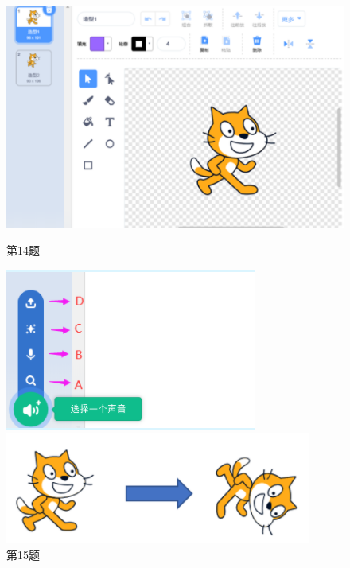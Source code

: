 \documentclass[10.5pt, a4paper]{article}
\begin{document}
\begin{enumerate}
        \begin{figure}[htbp]
            \centering
            \begin{minipage}[t]{.2\textwidth}
                \centering
                \includegraphics[width=\textwidth]{14.png}
                \caption*{第14题}
            \end{minipage}
            \begin{minipage}[t]{.2\textwidth}
                \centering
                \includegraphics[width=\textwidth]{15.png}
                \caption*{第15题}
            \end{minipage}
            \begin{minipage}[t]{.23\textwidth}
                \centering
                \includegraphics[width=\textwidth]{16.png}

\end{minipage}
\end{figure}
\end{enumerate}
\end{document}
